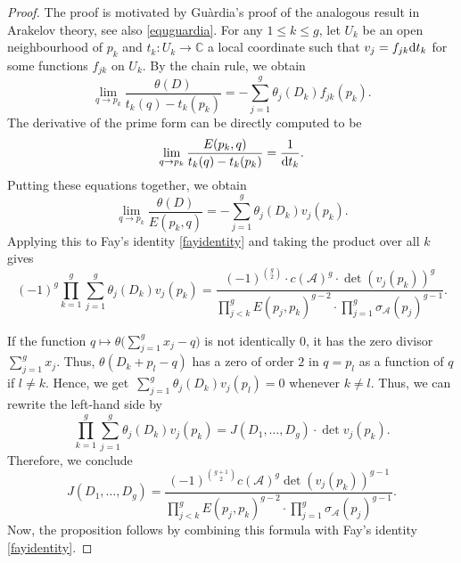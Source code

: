 \documentclass[10pt,a4paper]{amsart}
\numberwithin{equation}{section}
\begin{document}
\begin{proof}
	The proof is motivated by Gu\`ardia's proof \cite{Gua99} of the analogous result in Arakelov theory, see also \eqref{equguardia}.
	For any $1\le k\le g$, let $U_k$ be an open neighbourhood of $p_k$ and $t_k\colon U_k\to \mathbb{C}$ a local coordinate such that $v_j=f_{jk}{\rm d}t_k$ for some functions $f_{jk}$ on $U_k$. By the chain rule, we obtain
	\[\lim_{q\to p_k}\frac{\theta(D)}{t_k(q)-t_k(p_k)}=-\sum_{j=1}^g\theta_j(D_k)f_{jk}(p_k).\]
	The derivative of the prime form can be directly computed to be
	\begin{align}\label{derivE}
		\lim_{q\to p_k} \frac{E(p_k,q)}{t_k(q)-t_k(p_k)}=\frac{1}{{\rm d}t_k}.
	\end{align}
	Putting these equations together, we obtain
	\[\lim_{q\to p_k}\frac{\theta(D)}{E(p_k,q)}=-\sum_{j=1}^g\theta_j(D_k)v_j(p_k).\]
	Applying this to Fay's identity \eqref{fayidentity} and taking the product over all $k$ gives
	\[(-1)^g\prod_{k=1}^g\sum_{j=1}^g\theta_j(D_k)v_j(p_k)=\frac{(-1)^{\binom{g}{2}}\cdot c(\mathcal{A})^g\cdot\det(v_j(p_k))^g}{\prod_{j<k}^{g}E(p_j,p_k)^{g-2}\cdot\prod_{j=1}^g\sigma_{\mathcal{A}}(p_j)^{g-1}}.\]
	
	If the function $q\mapsto\theta\bigl(\sum_{j=1}^g x_j-q\bigr)$ is not identically $0$, it has the zero divisor $\sum_{j=1}^g x_j$. Thus, $\theta(D_k+p_l-q)$ has a zero of order $2$ in $q=p_l$ as a function of $q$ if $l\neq k$. Hence, we get~${\sum_{j=1}^g \theta_j(D_k)v_j(p_l)=0}$ whenever $k\neq l$. Thus, we can rewrite the left-hand side by
	\[\prod_{k=1}^g\sum_{j=1}^g\theta_j(D_k)v_j(p_k)=J(D_1,\dots,D_g)\cdot \det v_j(p_k).\]
	Therefore, we conclude
	\[J(D_1,\dots,D_g)=\frac{(-1)^{\binom{g+1}{2}}c(\mathcal{A})^g\det(v_j(p_k))^{g-1}}{\prod_{j<k}^{g}E(p_j,p_k)^{g-2}\cdot\prod_{j=1}^g\sigma_{\mathcal{A}}(p_j)^{g-1}}.\]
	Now, the proposition follows by combining this formula with Fay's identity \eqref{fayidentity}.
\end{proof}
\end{document}
